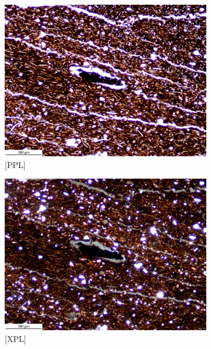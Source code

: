 \documentclass[a4paper]{article}
\begin{document}
\begin{figure}[H]
	\centering
	\begin{subfigure}[t]{.49\textwidth}
		\includegraphics[width=\textwidth]{ThinSections/99-1_4x_PPL.jpg}
		\caption{[PPL]}
	\end{subfigure}\hspace{.5em}\hfill
	\begin{subfigure}[t]{.49\textwidth}
		\includegraphics[width=\textwidth]{ThinSections/99-1_4x_XPL.jpg}
		\caption{[XPL]}
	\end{subfigure}
	\begin{subfigure}[t]{.32\textwidth}

\end{subfigure}
\end{figure}
\end{document}
